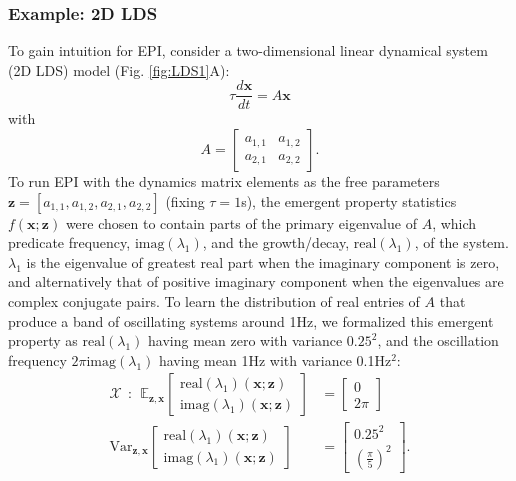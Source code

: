\documentclass[11pt]{article}
\begin{document}
\subsubsection{Example: 2D LDS}\label{methods_2DLDS}
To gain intuition for EPI, consider a two-dimensional linear dynamical system (2D LDS) model (Fig. \ref{fig:LDS1}A):
\begin{equation} 
\tau \frac{d\mathbf{x}}{dt} = A\mathbf{x}
\end{equation}
with
\begin{equation}
A = \begin{bmatrix} a_{1,1} & a_{1,2} \\ a_{2,1} & a_{2,2} \end{bmatrix}.
\end{equation}
To run EPI with the dynamics matrix elements as the free parameters $\mathbf{z} = [ a_{1,1}, a_{1,2}, a_{2,1}, a_{2,2}]$ (fixing $\tau=1$s), the emergent property statistics $f(\mathbf{x}; \mathbf{z})$ were chosen to contain parts of the primary eigenvalue of $A$, which predicate frequency, $\text{imag}(\lambda_1)$, and the growth/decay, $\text{real}(\lambda_1)$, of the system. 
$\lambda_1$ is the eigenvalue of greatest real part when the imaginary component is zero, and alternatively that of positive imaginary component when the eigenvalues are complex conjugate pairs.  
To learn the distribution of real entries of $A$ that produce a band of oscillating systems around 1Hz, we formalized this emergent property as $\text{real}(\lambda_1)$ having mean zero with variance $0.25^2$, and the oscillation frequency $2 \pi \text{imag}(\lambda_1)$ having mean 1Hz with variance 0.1Hz$^2$:
\begin{equation}
\begin{split}
\mathcal{X} ~~:~~ \mathbb{E}_{\mathbf{z}, \mathbf{x}} \begin{bmatrix} \text{real}(\lambda_1)(\mathbf{x}; \mathbf{z}) \\ \text{imag}(\lambda_1)(\mathbf{x}; \mathbf{z}) \end{bmatrix} &= \begin{bmatrix} 0 \\ 2\pi \end{bmatrix} \\
\text{Var}_{\mathbf{z}, \mathbf{x}} \begin{bmatrix} \text{real}(\lambda_1)(\mathbf{x}; \mathbf{z}) \\ \text{imag}(\lambda_1)(\mathbf{x}; \mathbf{z}) \end{bmatrix} &= \begin{bmatrix} 0.25^2 \\ (\frac{\pi}{5})^2 \end{bmatrix}.
\end{split}
\end{equation}
\end{document}
